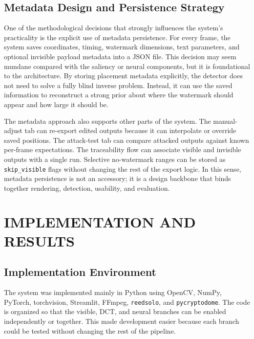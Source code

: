 \documentclass[12pt,oneside]{report}
\begin{document}
\section{Metadata Design and Persistence Strategy}
One of the methodological decisions that strongly influences the system's practicality is the explicit use of metadata persistence. For every frame, the system saves coordinates, timing, watermark dimensions, text parameters, and optional invisible payload metadata into a JSON file. This decision may seem mundane compared with the saliency or neural components, but it is foundational to the architecture. By storing placement metadata explicitly, the detector does not need to solve a fully blind inverse problem. Instead, it can use the saved information to reconstruct a strong prior about where the watermark should appear and how large it should be.

The metadata approach also supports other parts of the system. The manual-adjust tab can re-export edited outputs because it can interpolate or override saved positions. The attack-test tab can compare attacked outputs against known per-frame expectations. The traceability flow can associate visible and invisible outputs with a single run. Selective no-watermark ranges can be stored as \texttt{skip\_visible} flags without changing the rest of the export logic. In this sense, metadata persistence is not an accessory; it is a design backbone that binds together rendering, detection, usability, and evaluation.

\clearpage
\chapter{IMPLEMENTATION AND RESULTS}
\section{Implementation Environment}
The system was implemented mainly in Python using OpenCV, NumPy, PyTorch, torchvision, Streamlit, FFmpeg, \texttt{reedsolo}, and \texttt{pycryptodome}. The code is organized so that the visible, DCT, and neural branches can be enabled independently or together. This made development easier because each branch could be tested without changing the rest of the pipeline.
\end{document}
